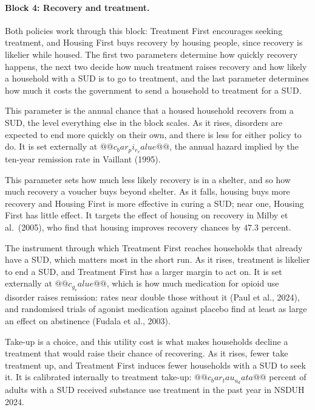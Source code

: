 \documentclass[10pt]{article}
\begin{document}
\paragraph{Block 4: Recovery and treatment.} Both policies work through this block: Treatment First encourages seeking treatment, and Housing First buys recovery by housing people, since recovery is likelier while housed.  The first two parameters determine how quickly recovery happens, the next two decide how much treatment raises recovery and how likely a household with a SUD is to go to treatment, and the last parameter determines how much it costs the government to send a household to treatment for a SUD.
\begin{description}\setlength{\itemsep}{0.25em}\setlength{\parskip}{0em}
\item[$\bar\pi_r$, the baseline SUD recovery rate.] This parameter is the annual chance that a housed household recovers from a SUD, the level everything else in the block scales. As it rises, disorders are expected to end more quickly on their own, and there is less for either policy to do. It is set externally at $@@c_bar_pi_r_value@@$, the annual hazard implied by the ten-year remission rate in Vaillant (1995).
\item[$\mu_H$, SUD recovery when homeless.] This parameter sets how much less likely recovery is in a shelter, and so how much recovery a voucher buys beyond shelter. As it falls, housing buys more recovery and Housing First is more effective in curing a SUD; near one, Housing First has little effect. It targets the effect of housing on recovery in Milby et al.\ (2005), who find that housing improves recovery chances by $47.3$ percent.
\item[$g$, the treatment effect on recovery.] The instrument through which Treatment First reaches households that already have a SUD, which matters most in the short run. As it rises, treatment is likelier to end a SUD, and Treatment First has a larger margin to act on. It is set externally at $@@c_g_value@@$, which is how much medication for opioid use disorder raises remission: rates near double those without it (Paul et al., 2024), and randomised trials of agonist medication against placebo find at least as large an effect on abstinence (Fudala et al., 2003).
\item[$\bar\tau^{u}$, the utility cost of treatment.] Take-up is a choice, and this utility cost is what makes households decline a treatment that would raise their chance of recovering. As it rises, fewer take treatment up, and Treatment First induces fewer households with a SUD to seek it. It is calibrated internally to treatment take-up: $@@c_bar_tau_u_data@@$ percent of adults with a SUD received substance use treatment in the past year in NSDUH 2024.

\end{description}
\end{document}
